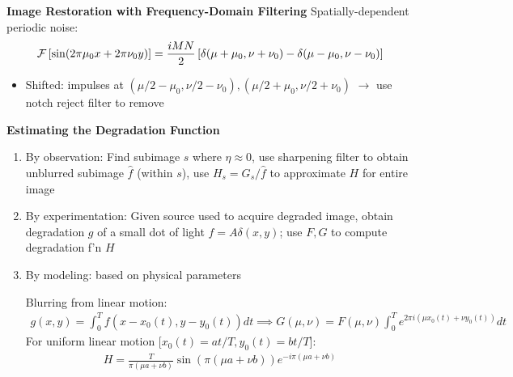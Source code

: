 \documentclass[12pt]{extarticle}
\begin{document}
\newp
\textbf{Image Restoration with Frequency-Domain Filtering}
Spatially-dependent periodic noise: \begin{align*}
    \mathcal{F}\left[\sin(2\pi\mu_0x+2\pi\nu_0y)\right]=\frac{iMN}{2}\left[\delta(\mu+\mu_0,\nu+\nu_0)-\delta(\mu-\mu_0,\nu-\nu_0)\right]
\end{align*}
\begin{itemize}
    \item Shifted: impulses at $(\mu/2-\mu_0,\nu/2-\nu_0),(\mu/2+\mu_0,\nu/2+\nu_0)$ $\to$ use notch reject filter to remove
\end{itemize}

\newp
\textbf{Estimating the Degradation Function}
\begin{enumerate}
    \item By observation: Find subimage $s$ where $\eta\approx0$, use sharpening filter to obtain unblurred subimage $\hat{f}$ (within $s$), use $H_s=G_s/\hat{f}$ to approximate $H$ for entire image
    \item By experimentation: Given source used to acquire degraded image, obtain degradation $g$ of a small dot of light $f=A\delta(x,y)$; use $F,G$ to compute degradation f'n $H$
    \item By modeling: based on physical parameters

    Blurring from linear motion: \begin{align*}
        g(x,y)=\int_0^Tf(x-x_0(t),y-y_0(t))dt\implies G(\mu,\nu)=F(\mu,\nu)\int_0^Te^{2\pi i(\mu x_0(t)+\nu y_0(t))}dt
    \end{align*}
    For uniform linear motion [$x_0(t)=at/T,y_0(t)=bt/T$]: \begin{align*}
        H=\frac{T}{\pi(\mu a+\nu b)}\sin\left(\pi(\mu a+\nu b)\right)e^{-i\pi(\mu a+\nu b)}
    \end{align*}
\end{enumerate}
\end{document}
